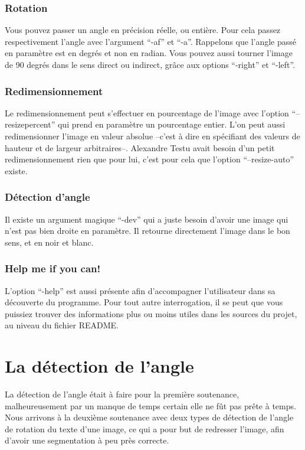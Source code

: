 \documentclass[a4paper,12pt]{report}
\begin{document}
\subsection{ Rotation }
 Vous pouvez passer un angle en pr\'ecision r\'eelle, ou enti\`ere. Pour
 cela passez respectivement l'angle avec l'argument ``-af'' et ``-a''.
 Rappelons que l'angle pass\'e en param\`etre est en degr\'es et non en
 radian. Vous pouvez aussi tourner l'image de 90 degr\'es dans le sens
 direct ou indirect, gr\^ace aux options ``-right'' et ``-left''.
\subsection{ Redimensionnement }
 Le redimensionnement peut s'effectuer en pourcentage de l'image avec
 l'option ``--resizepercent'' qui prend en param\`etre un pourcentage
 entier. L'on peut aussi redimensionner l'image en valeur absolue
 --c'est \`a dire en sp\'ecifiant des valeurs de hauteur et de largeur
 arbitraires--. Alexandre Testu avait besoin d'un petit redimensionnement
 rien que pour lui, c'est pour cela que l'option ``--resize-auto''
 existe.
\subsection{ D\'etection d'angle}
 Il existe un argument magique ``-dev'' qui a juste besoin d'avoir une
 image qui n'est pas bien droite en param\`etre. Il retourne directement
 l'image dans le bon sens, et en noir et blanc.
\subsection{ Help me if you can! }
 L'option ``-help'' est aussi pr\'esente afin d'accompagner
 l'utilisateur dans sa d\'ecouverte du programme. Pour tout autre
 interrogation, il se peut que vous puissiez trouver des informations
 plus ou moins utiles dans les sources du projet, au niveau du fichier
 README.


\chapter{ La d\'etection de l'angle }
 La d\'etection de l'angle \'etait \`a faire pour la premi\`ere
 soutenance, malheureusement par un manque de temps certain elle ne f\^ut
 pas pr\^ete \`a temps. Nous arrivons \`a la deuxi\`eme soutenance avec
 deux types de d\'etection de l'angle de rotation du texte d'une image,
 ce qui a pour but de redresser l'image, afin d'avoir une segmentation
 \`a peu pr\`es correcte.
\end{document}
